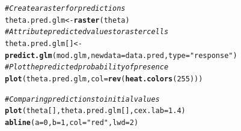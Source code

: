 \documentclass[a4paper, 12pt, leqno]{article}\usepackage[]{graphicx}\usepackage[]{color}
\makeatletter
\newcommand{\hlnum}[1]{\textcolor[rgb]{0.686,0.059,0.569}{#1}}%
\newcommand{\hlstr}[1]{\textcolor[rgb]{0.192,0.494,0.8}{#1}}%
\newcommand{\hlcom}[1]{\textcolor[rgb]{0.678,0.584,0.686}{\textit{#1}}}%
\newcommand{\hlstd}[1]{\textcolor[rgb]{0.345,0.345,0.345}{#1}}%
\newcommand{\hlkwb}[1]{\textcolor[rgb]{0.69,0.353,0.396}{#1}}%
\newcommand{\hlkwc}[1]{\textcolor[rgb]{0.333,0.667,0.333}{#1}}%
\newcommand{\hlkwd}[1]{\textcolor[rgb]{0.737,0.353,0.396}{\textbf{#1}}}%
\newenvironment{kframe}{%
 \def\at@end@of@kframe{}%
 \ifinner\ifhmode%
  \def\at@end@of@kframe{\end{minipage}}%
  \begin{minipage}{\columnwidth}%
 \fi\fi%
 \def\FrameCommand##1{\hskip\@totalleftmargin \hskip-\fboxsep
 \colorbox{shadecolor}{##1}\hskip-\fboxsep
     \hskip-\linewidth \hskip-\@totalleftmargin \hskip\columnwidth}%
 \MakeFramed {\advance\hsize-\width
   \@totalleftmargin\z@ \linewidth\hsize
   \@setminipage}}%
 {\par\unskip\endMakeFramed%
 \at@end@of@kframe}
\newenvironment{knitrout}{}{} %
\makeatother
\begin{document}
\begin{knitrout}\small
{}\color{fgcolor}\begin{kframe}
\begin{alltt}
\hlcom{# Create a raster for predictions}
\hlstd{theta.pred.glm} \hlkwb{<-} \hlkwd{raster}\hlstd{(theta)}
\hlcom{# Attribute predicted values to raster cells}
\hlstd{theta.pred.glm[]} \hlkwb{<-} \hlkwd{predict.glm}\hlstd{(mod.glm,}\hlkwc{newdata}\hlstd{=data.pred,}\hlkwc{type}\hlstd{=}\hlstr{"response"}\hlstd{)}
\hlcom{# Plot the predicted probability of presence}
\hlkwd{plot}\hlstd{(theta.pred.glm,}\hlkwc{col}\hlstd{=}\hlkwd{rev}\hlstd{(}\hlkwd{heat.colors}\hlstd{(}\hlnum{255}\hlstd{)))}
\end{alltt}
\end{kframe}
\end{knitrout}


\begin{knitrout}\small
{}\color{fgcolor}\begin{kframe}
\begin{alltt}
\hlcom{# Comparing predictions to initial values}
\hlkwd{plot}\hlstd{(theta[],theta.pred.glm[],}\hlkwc{cex.lab}\hlstd{=}\hlnum{1.4}\hlstd{)}
\hlkwd{abline}\hlstd{(}\hlkwc{a}\hlstd{=}\hlnum{0}\hlstd{,}\hlkwc{b}\hlstd{=}\hlnum{1}\hlstd{,}\hlkwc{col}\hlstd{=}\hlstr{"red"}\hlstd{,}\hlkwc{lwd}\hlstd{=}\hlnum{2}\hlstd{)}
\end{alltt}
\end{kframe}
\end{knitrout}
\end{document}
